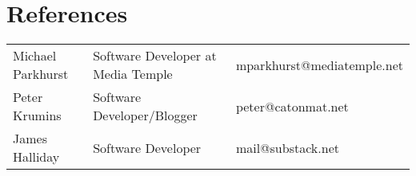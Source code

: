 \documentclass[table,tmargin=1in,bmargin=1in,letterpaper]{resume}
\begin{document}
\section{References}
\begin{tabular}{lll}
\rowcolor{white} Michael Parkhurst & Software Developer at Media Temple & mparkhurst@mediatemple.net \\
\rowcolor{lightgray} Peter Krumins & Software Developer/Blogger & peter@catonmat.net \\
\rowcolor{white} James Halliday & Software Developer & mail@substack.net
\end{tabular}
\end{document}
